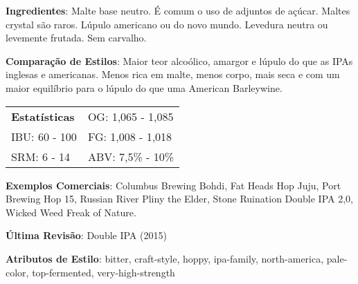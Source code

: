 \textbf{Ingredientes}: Malte base neutro. É comum o uso de adjuntos de açúcar. Maltes crystal são raros. Lúpulo americano ou do novo mundo. Levedura neutra ou levemente frutada. Sem carvalho.

\textbf{Comparação de Estilos}: Maior teor alcoólico, amargor e lúpulo do que as IPAs inglesas e americanas. Menos rica em malte, menos corpo, mais seca e com um maior equilíbrio para o lúpulo do que uma American Barleywine.

\begin{tabular}{@{}p{35mm}p{35mm}@{}}
  \textbf{Estatísticas} & OG: 1,065 - 1,085  \\
  IBU: 60 - 100  & FG: 1,008 - 1,018   \\
  SRM: 6 - 14 & ABV: 7,5\% - 10\%
\end{tabular}

\textbf{Exemplos Comerciais}: Columbus Brewing Bohdi, Fat Heads Hop Juju, Port Brewing Hop 15, Russian River Pliny the Elder, Stone Ruination Double IPA 2,0, Wicked Weed Freak of Nature.

\textbf{Última Revisão}: Double IPA (2015)

\textbf{Atributos de Estilo}: bitter, craft-style, hoppy, ipa-family, north-america, pale-color, top-fermented, very-high-strength
